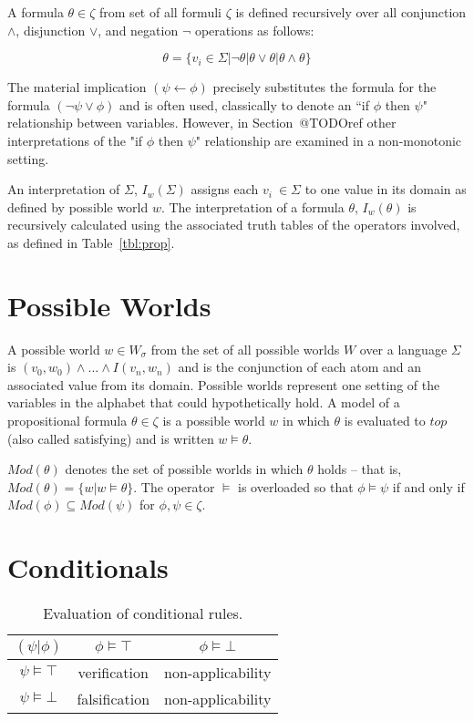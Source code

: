 A formula $\theta \in \zeta$ from set of all formuli $\zeta$ is defined recursively over all conjunction $\land$, disjunction $\lor$, and negation $\lnot$ operations as follows:

\[
\theta = \{ v_i \in \Sigma | \lnot \theta | \theta \lor \theta | \theta \land \theta \}
\]


The material implication $(\psi \leftarrow \phi)$ precisely substitutes the formula for the formula $(\lnot \psi \lor \phi)$ and is often used, classically to denote an ``if $\phi$ then $\psi$" relationship between variables. However, in Section~@TODOref other interpretations of the "if $\phi$ then $\psi$" relationship are examined in a non-monotonic setting.

An interpretation of $\Sigma$, $I_w(\Sigma)$ assigns each $v_i\ \in \Sigma$ to one value in its domain as defined by possible world $w$. The interpretation of a formula $\theta$, $I_w(\theta)$ is recursively calculated using the associated truth tables of the operators involved, as defined in Table~\ref{tbl:prop}. 

\section{Possible Worlds}
A possible world $w\in W_\sigma$ from the set of all possible worlds $W$ over a language $\Sigma$ is $(v_0,w_0) \land ... \land I(v_n,w_n)$ and is the conjunction of each atom and an associated value from its domain. Possible worlds represent one setting of the variables in the alphabet that could hypothetically hold. A model of a propositional formula $\theta \in \zeta$ is a possible world $w$ in which $\theta$ is evaluated to $top$ (also called satisfying) and is written $w \models \theta$. 

$Mod(\theta)$ denotes the set of possible worlds in which $\theta$ holds -- that is, $Mod(\theta)=\{w|w\models \theta\}$. The operator $\models$ is overloaded so that $\phi \models \psi$ if and only if $Mod(\phi) \subseteq Mod(\psi)$ for $\phi,\psi \in \zeta$.

\section{Conditionals}
\begin{table}
\begin{center}
\begin{tabular}{ c | c c }
  $(\psi|\phi)$& $\phi\models \top$ & $\phi \models \bot$ \\ \hline
 $\psi\models \top$ & verification & non-applicability \\  
 $\psi \models \bot$ & falsification & non-applicability
\end{tabular}
\caption{Evaluation of conditional rules.}
\label{tbl:cond}
\end{center}
\end{table}

